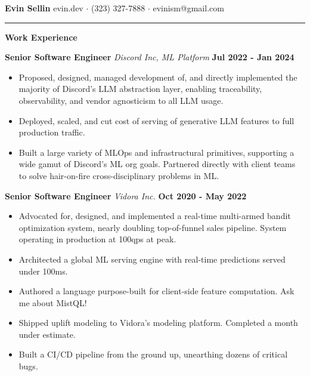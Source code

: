 \documentclass[10pt]{letter}
\begin{document}
\textbf{Evin Sellin}
\hfill
evin.dev $\cdot$ (323) 327-7888 $\cdot$ evinism@gmail.com
\vspace{4px}
\hrule
\textbf{Work Experience}

\hspace*{2px}
\textbf{Senior Software Engineer}
\textit{Discord Inc, ML Platform}
\hfill 
\textbf{Jul 2022 - Jan 2024}
\begin{itemize}
  \item Proposed, designed, managed development of, and directly implemented the majority of Discord's LLM abstraction layer, enabling traceability, observability, and vendor agnosticism to all LLM usage.
  \item Deployed, scaled, and cut cost of serving of generative LLM features to full production traffic.
  \item Built a large variety of MLOps and infrastructural primitives, supporting a wide gamut of Discord's ML org goals. Partnered directly with client teams to solve hair-on-fire cross-disciplinary problems in ML.
\end{itemize}

\hspace*{2px}
\textbf{Senior Software Engineer} 
\textit{Vidora Inc.}
\hfill 
\textbf{Oct 2020 - May 2022}
\begin{itemize}
  \item Advocated for, designed, and implemented a real-time multi-armed bandit optimization system, nearly doubling top-of-funnel sales pipeline. System operating in production at 100qps at peak.
  \item Architected a global ML serving engine with real-time predictions served under 100ms.
  \item Authored a language purpose-built for client-side feature computation. Ask me about MistQL!
  \item Shipped uplift modeling to Vidora's modeling platform. Completed a month under estimate.
  \item Built a CI/CD pipeline from the ground up, unearthing dozens of critical bugs.
\end{itemize}
\end{document}
